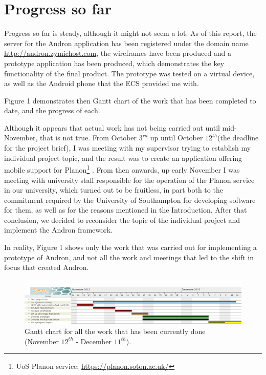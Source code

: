 \documentclass[12pt]{ecsproject}     %
\begin{document}
\pagebreak
\section{Progress so far}

Progress so far is steady, although it might not seem a lot. As of this report, the server for the Andron application has been registered under the domain name \hyperlink{http://andron.zymichost.com}{http://andron.zymichost.com}, the wireframes have been produced and a prototype application has been produced, which demonstrates the key functionality of the final product. The prototype was tested on a virtual device, as well as the Android phone that the ECS provided me with.

Figure 1 demonstrates then Gantt chart of the work that has been completed to date, and the progress of each.

Although it appears that actual work has not being carried out until mid-November, that is not true. From October $3^{rd}$ up  until October $12^{th}$(the deadline for the project brief), I was meeting with my supervisor trying to establish my individual project topic, and the result was to create an application offering mobile support for Planon\footnote{UoS Planon service: \hyperlink{https://planon.soton.ac.uk/}{https://planon.soton.ac.uk/}} . From then onwards, up early November I was meeting with university staff responsible for the operation of the Planon service in our university, which turned out to be fruitless, in part both to the commitment required by the University of Southampton for developing software for them, as well as for the reasons mentioned in the Introduction. After that conclusion, we decided to reconsider the topic of the individual project and implement the Andron framework.

In reality, Figure 1 shows only the work that was carried out for implementing a prototype of Andron, and not all the work and meetings that led to the shift in focus that created Andron.

\begin{landscape}
\begin{figure}
\includegraphics[scale=0.5]{proto.png}
\caption{Gantt chart for all the work that has been currently done (November $12^{th}$ - December $11^{th}$).}
\end{figure}
\end{landscape}
\end{document}
